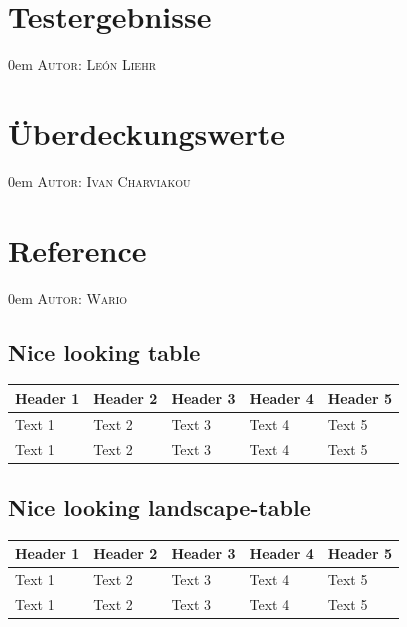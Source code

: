 \documentclass{article}
\makeatletter
\newcommand{\sectionauthor}[1]{
	{\parindent 0em \large \scshape Autor: #1 \par \nobreak \vspace*{1em}}
	\@afterheading
}
\makeatother
\begin{document}
\newpage

\section{Testergebnisse}
\sectionauthor{León Liehr}



\newpage

\section{Überdeckungswerte}
\sectionauthor{Ivan Charviakou}



\newpage

\section{Reference}
\sectionauthor{Wario}

\subsection{Nice looking table}
\begin{longtable}{@{}lllll@{}}
\toprule
\textbf{Header 1} & \textbf{Header 2} & \textbf{Header 3} & \textbf{Header 4} & \textbf{Header 5} \\* \midrule
\endfirsthead
%
\endhead
%
Text 1            & Text 2            & Text 3            & Text 4            & Text 5            \\
Text 1            & Text 2            & Text 3            & Text 4            & Text 5            \\* \bottomrule
\end{longtable}

\subsection{Nice looking landscape-table}
\begin{landscape}
\begin{longtable}{@{}lllll@{}}
\toprule
\textbf{Header 1} & \textbf{Header 2} & \textbf{Header 3} & \textbf{Header 4} & \textbf{Header 5} \\* \midrule
\endfirsthead
%
\endhead
%
Text 1            & Text 2            & Text 3            & Text 4            & Text 5            \\
Text 1            & Text 2            & Text 3            & Text 4            & Text 5            \\* \bottomrule
\end{longtable}
\end{landscape}

\newpage
\end{document}
